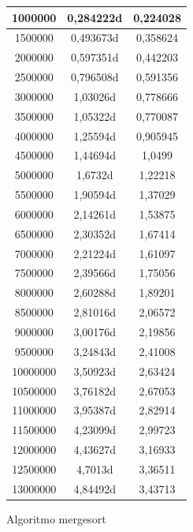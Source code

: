 \documentclass[12pt,spanish]{article}
\begin{document}
\begin{figure}[H]
\begin{tabular}{|c|c|c|}
\hline
1000000 & 0,284222d & 0,224028 \\
\hline
1500000 & 0,493673d & 0,358624 \\
\hline
2000000 & 0,597351d & 0,442203 \\
\hline
2500000 & 0,796508d & 0,591356 \\
\hline
3000000 & 1,03026d & 0,778666 \\
\hline
3500000 & 1,05322d & 0,770087 \\
\hline
4000000 & 1,25594d & 0,905945 \\
\hline
4500000 & 1,44694d & 1,0499 \\
\hline
5000000 & 1,6732d & 1,22218 \\
\hline
5500000 & 1,90594d & 1,37029 \\
\hline
6000000 & 2,14261d & 1,53875 \\
\hline
6500000 & 2,30352d & 1,67414 \\
\hline
7000000 & 2,21224d & 1,61097 \\
\hline
7500000 & 2,39566d & 1,75056 \\
\hline
8000000 & 2,60288d & 1,89201 \\
\hline
8500000 & 2,81016d & 2,06572 \\
\hline
9000000 & 3,00176d & 2,19856 \\
\hline
9500000 & 3,24843d & 2,41008 \\
\hline
10000000 & 3,50923d & 2,63424 \\
\hline
10500000 & 3,76182d & 2,67053 \\
\hline
11000000 & 3,95387d & 2,82914 \\
\hline
11500000 & 4,23099d & 2,99723 \\
\hline
12000000 & 4,43627d & 3,16933 \\
\hline
12500000 & 4,7013d & 3,36511 \\
\hline
13000000 & 4,84492d & 3,43713 \\
\hline
\end{tabular}
\caption{Algoritmo mergesort}
\end{figure}
\end{document}

